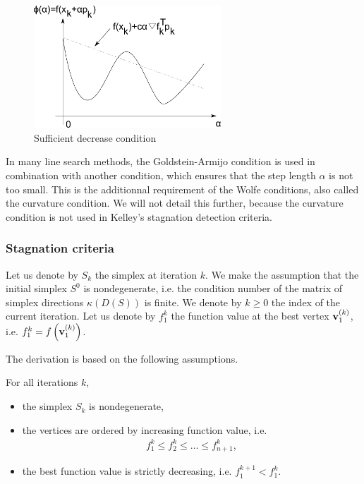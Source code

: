 \begin{figure}
\begin{center}
\includegraphics[width=7cm]{neldermeadmethod/sufficientdecrease.pdf}
\end{center}
\caption{Sufficient decrease condition}
\label{fig-nm-sufficientdecrease}
\end{figure}

In many line search methods, the Goldstein-Armijo condition is 
used in combination with another condition, which ensures that 
the step length $\alpha$ is not too small. This is the additionnal requirement
of the Wolfe conditions, also called the curvature condition.
We will not detail this further, because the curvature condition is 
not used in Kelley's stagnation detection criteria.

\subsubsection{Stagnation criteria}

Let us denote by $S_k$ the simplex at iteration $k$. 
We make the assumption that the initial simplex $S^0$ is nondegenerate, i.e.
the condition number of the matrix of simplex directions $\kappa(D(S))$ is finite.
We denote by $k\geq 0$ the index of the current iteration. 
Let us denote by $f_1^k$ the function value at the best vertex $\mathbf{v}_1^{(k)}$, i.e. 
$f_1^k = f \left( \mathbf{v}_1^{(k)} \right)$.

The derivation is based on the following assumptions.

\begin{assumption}
\label{assumption-kelleystagnation1}
For all iterations $k$, 
\begin{itemize}
\item the simplex $S_k$ is nondegenerate,
\item the vertices are ordered by increasing function value, i.e. 
\begin{eqnarray}
f_1^k \leq f_2^k \leq \ldots \leq f_{n+1}^k,
\end{eqnarray}
\item the best function value is strictly decreasing, i.e. $f_1^{k+1} < f_1^k$.
\end{itemize}
\end{assumption}

